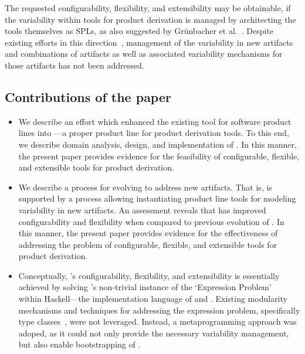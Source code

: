 

The requested configurability, flexibility, and extensibility may be obtainable, if the variability within tools for product derivation is managed by architecting the tools themselves as SPLs, as also suggested by Gr{\"u}nbacher et al.~\cite{grunbacher:2008}. Despite existing efforts in this direction~\cite{grunbacher:2011,grunbacher:2008,batory-ahead-bootstrap}, management of the variability in new artifacts and combinations of artifacts as well as associated variability mechanisms for those artifacts has not been addressed. 


\subsection*{Contributions of the paper}

\begin{itemize}

\item We describe an effort which enhanced the existing \hp{} tool for software product lines into \hpl---a proper
  product line for product derivation tools. To this end, we describe domain analysis, design, and implementation of \hpl. In this manner, the present paper provides evidence for the feasibility of configurable, flexible, and extensible tools for product derivation.

\item We describe a process for evolving \hpl{} to address new artifacts. That is, \hpl{} is supported by a process allowing instantiating product line tools for modeling variability in new artifacts. An assessment reveals that \hpl{} has improved configurability and flexibility when compared to previous evolution of \hp. In this manner, the present paper provides evidence for the effectiveness of addressing the problem of configurable, flexible, and extensible tools for product derivation.

\item Conceptually, \hpl's configurability, flexibility, and extensibility is essentially achieved by solving \hp's non-trivial instance of the `Expression Problem'~\cite{Wadler98,Lopez-HerrejonBC05} within Haskell---the implementation language of \hp{} and \hpl{}. Existing modularity mechanisms and techniques for addressing the expression problem, specifically type classes~\cite{LaemmelO06}, were not leveraged. Instead, a metaprogramming approach was adoped, as it could not only provide the necessary variability management, but also enable bootstrapping of \hpl.

\end{itemize}

